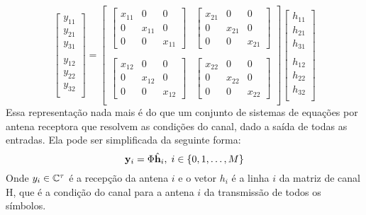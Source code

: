 \documentclass{article}
\begin{document}
	\begin{equation}
		\begin{bmatrix}
			y_{11}\\
			y_{21}\\
			y_{31}\\ 
			\\ 
			y_{12}\\
			y_{22}\\
			y_{32}\\
		\end{bmatrix} 
		= 
		\begin{bmatrix}
			\begin{bmatrix}
				x_{11}&0&0\\
				0&x_{11}&0\\ 
				0&0&x_{11}
			\end{bmatrix} & \begin{bmatrix}
				x_{21}&0&0\\
				0&x_{21}&0\\ 
				0&0&x_{21} 
			\end{bmatrix} \\
			\\ 
			\begin{bmatrix}
				x_{12}&0&0\\
				0&x_{12}&0\\ 
				0&0&x_{12}
			\end{bmatrix} & \begin{bmatrix}
				x_{22}&0&0\\
				0&x_{22}&0\\ 
				0&0&x_{22} 
			\end{bmatrix} \\
		\end{bmatrix}
		\begin{bmatrix}
			h_{11}\\
			h_{21}\\
			h_{31}\\
			\\ 
			h_{12}\\
			h_{22}\\
			h_{32}\\
		\end{bmatrix}
	\end{equation}
	Essa representação nada mais é do que um conjunto de sistemas de equações por antena receptora que resolvem as condições do canal, dado a saída de todas as entradas. Ela pode ser simplificada da seguinte forma:
	\begin{equation}
			\mathbf{y}_i = \Phi \hat{\mathbf{h}}_i,\;i\in\{0,1,\dots,M\}
	\end{equation}
	Onde $y_i\in\mathbb{C}^\tau$ é a recepção da antena $i$ e o vetor $h_i$ é a linha $i$ da matriz de canal H, que é a condição do canal para a antena $i$ da transmissão de todos os símbolos. 
\end{document}
